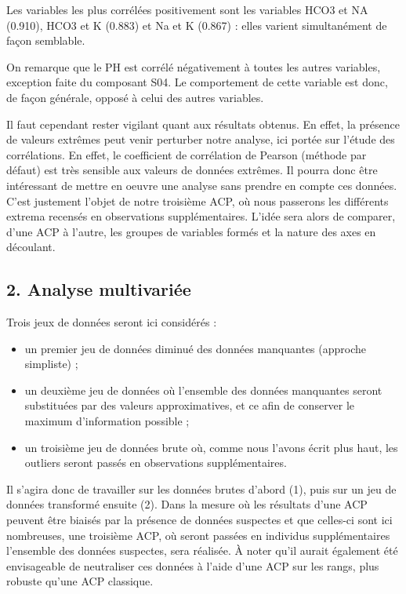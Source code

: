 \documentclass[]{article}
\providecommand{\tightlist}{%
  \setlength{\itemsep}{0pt}\setlength{\parskip}{0pt}}
\begin{document}
Les variables les plus corrélées positivement sont les variables HCO3 et
NA (0.910), HCO3 et K (0.883) et Na et K (0.867) : elles varient
simultanément de façon semblable.

On remarque que le PH est corrélé négativement à toutes les autres
variables, exception faite du composant S04. Le comportement de cette
variable est donc, de façon générale, opposé à celui des autres
variables.

Il faut cependant rester vigilant quant aux résultats obtenus. En effet,
la présence de valeurs extrêmes peut venir perturber notre analyse, ici
portée sur l'étude des corrélations. En effet, le coefficient de
corrélation de Pearson (méthode par défaut) est très sensible aux
valeurs de données extrêmes. Il pourra donc être intéressant de mettre
en oeuvre une analyse sans prendre en compte ces données. C'est
justement l'objet de notre troisième ACP, où nous passerons les
différents extrema recensés en observations supplémentaires. L'idée sera
alors de comparer, d'une ACP à l'autre, les groupes de variables formés
et la nature des axes en découlant.

\hypertarget{analyse-multivariee}{\subsection{2. Analyse
multivariée}\label{analyse-multivariee}}

Trois jeux de données seront ici considérés :

\begin{itemize}
\tightlist
\item
  un premier jeu de données diminué des données manquantes (approche
  simpliste) ;
\item
  un deuxième jeu de données où l'ensemble des données manquantes seront
  substituées par des valeurs approximatives, et ce afin de conserver le
  maximum d'information possible ;
\item
  un troisième jeu de données brute où, comme nous l'avons écrit plus
  haut, les outliers seront passés en observations supplémentaires.
\end{itemize}

Il s'agira donc de travailler sur les données brutes d'abord (1), puis
sur un jeu de données transformé ensuite (2). Dans la mesure où les
résultats d'une ACP peuvent être biaisés par la présence de données
suspectes et que celles-ci sont ici nombreuses, une troisième ACP, où
seront passées en individus supplémentaires l'ensemble des données
suspectes, sera réalisée. À noter qu'il aurait également été
envisageable de neutraliser ces données à l'aide d'une ACP sur les
rangs, plus robuste qu'une ACP classique.
\end{document}
